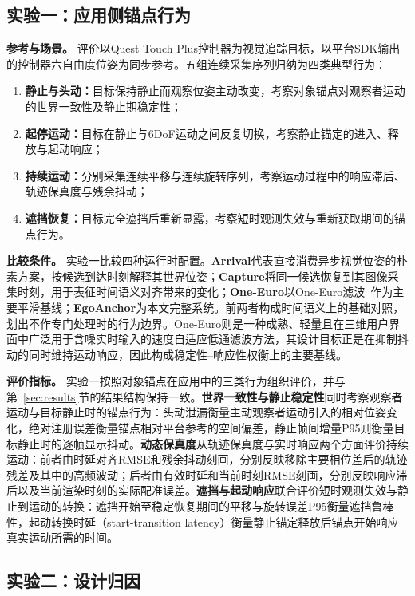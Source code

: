 \documentclass[review]{vgtc}
\begin{document}
\subsection{实验一：应用侧锚点行为}\label{sec:exp1-design}

\textbf{参考与场景。}
评价以Quest Touch Plus控制器为视觉追踪目标，以平台SDK输出的控制器六自由度位姿为同步参考。五组连续采集序列归纳为四类典型行为：
\begin{enumerate}
  \item \textbf{静止与头动：}目标保持静止而观察位姿主动改变，考察对象锚点对观察者运动的世界一致性及静止期稳定性；
  \item \textbf{起停运动：}目标在静止与6DoF运动之间反复切换，考察静止锚定的进入、释放与起动响应；
  \item \textbf{持续运动：}分别采集连续平移与连续旋转序列，考察运动过程中的响应滞后、轨迹保真度与残余抖动；
  \item \textbf{遮挡恢复：}目标完全遮挡后重新显露，考察短时观测失效与重新获取期间的锚点行为。
\end{enumerate}

\textbf{比较条件。}
实验一比较四种运行时配置。\textbf{Arrival}代表直接消费异步视觉位姿的朴素方案，按候选到达时刻解释其世界位姿；\textbf{Capture}将同一候选恢复到其图像采集时刻，用于表征时间语义对齐带来的变化；\textbf{One-Euro}以One-Euro滤波~\cite{casiez2012oneeuro}作为主要平滑基线；\textbf{EgoAnchor}为本文完整系统。前两者构成时间语义上的基础对照，划出不作专门处理时的行为边界。One-Euro则是一种成熟、轻量且在三维用户界面中广泛用于含噪实时输入的速度自适应低通滤波方法，其设计目标正是在抑制抖动的同时维持运动响应，因此构成稳定性--响应性权衡上的主要基线。


\textbf{评价指标。}
实验一按照对象锚点在应用中的三类行为组织评价，并与第~\ref{sec:results}节的结果结构保持一致。\textbf{世界一致性与静止稳定性}同时考察观察者运动与目标静止时的锚点行为：头动泄漏衡量主动观察者运动引入的相对位姿变化，绝对注册误差衡量锚点相对平台参考的空间偏差，静止帧间增量P95则衡量目标静止时的逐帧显示抖动。\textbf{动态保真度}从轨迹保真度与实时响应两个方面评价持续运动：前者由时延对齐RMSE和残余抖动刻画，分别反映移除主要相位差后的轨迹残差及其中的高频波动；后者由有效时延和当前时刻RMSE刻画，分别反映响应滞后以及当前渲染时刻的实际配准误差。\textbf{遮挡与起动响应}联合评价短时观测失效与静止到运动的转换：遮挡开始至稳定恢复期间的平移与旋转误差P95衡量遮挡鲁棒性，起动转换时延（start-transition latency）衡量静止锚定释放后锚点开始响应真实运动所需的时间。

\subsection{实验二：设计归因}\label{sec:exp2-design}
\end{document}
